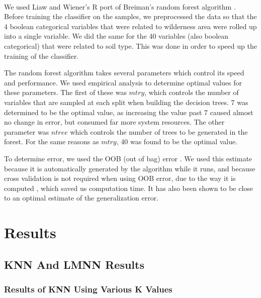 \documentclass[11pt]{article}
\begin{document}
    \paragraph{}
    We used Liaw and Wiener's R port \cite{liaw02} of Breiman's random forest algorithm \cite{breiman01}. Before training the classifier on the samples, we preprocessed the data so that the 4 boolean categorical variables that were related to wilderness area were rolled up into a single variable. We did the same for the 40 variables (also boolean categorical) that were related to soil type. This was done in order to speed up the training of the classifier.
    \par
    The random forest algorithm takes several parameters which control its speed and performance. We used empirical analysis to determine optimal values for these parameters. The first of these was $mtry$, which controls the number of variables that are sampled at each split when building the decision trees. 7 was determined to be the optimal value, as increasing the value past 7 caused almost no change in error, but consumed far more system resources. The other parameter was $ntree$ which controls the number of trees to be generated in the forest. For the same reasons as $mtry$, 40 was found to be the optimal value.
    \par
    To determine error, we used the OOB (out of bag) error \cite{breiman96}. We used this estimate because it is automatically generated by the algorithm while it runs, and because cross validation is not required when using OOB error, due to the way it is computed \cite{breiman01, breiman96}, which saved us computation time. It has also been shown to be close to an optimal estimate of the generalization error\cite{breiman96}.
    \section{Results}
    \subsection{KNN And LMNN Results}
    \subsubsection{Results of KNN Using Various K Values}
\end{document}
